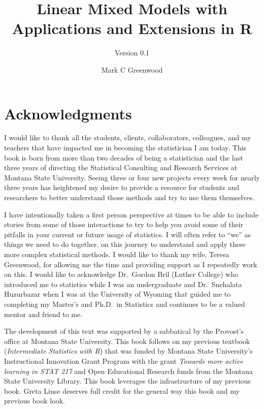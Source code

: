 \documentclass[
]{book}
\title{Linear Mixed Models with Applications and Extensions in R}
\subtitle{Version 0.1}
\author{Mark C Greenwood}
\date{}
\begin{document}
\maketitle

{
\setcounter{tocdepth}{1}
\tableofcontents
}
\hypertarget{acknowledgments}{%
\chapter*{Acknowledgments}\label{acknowledgments}}

I would like to thank all the students, clients, collaborators, colleagues, and my teachers that have impacted me in becoming the statistician I am today. This book is born from more than two decades of being a statistician and the last three years of directing the Statistical Consulting and Research Services at Montana State University. Seeing three or four new projects every week for nearly three years has heightened my desire to provide a resource for students and researchers to better understand those methods and try to use them themselves.

I have intentionally taken a first person perspective at times to be able to include stories from some of those interactions to try to help you avoid some of their pitfalls in your current or future usage of statistics. I will often refer to ``we'' as things we need to do together, on this journey to understand and apply these more complex statistical methods. I would like to thank my wife, Teresa Greenwood, for allowing me the time and providing support as I repeatedly work on this. I would like to acknowledge Dr.~Gordon Bril (Luther College) who introduced me to statistics while I was an undergraduate and Dr.~Snehalata Huzurbazar when I was at the University of Wyoming that guided me to completing my Master's and Ph.D.~in Statistics and continues to be a valued mentor and friend to me.

The development of this text was supported by a sabbatical by the Provost's office at Montana State University. This book follows on my previous textbook (\emph{Intermediate Statistics with R}) that was funded by Montana State University's Instructional Innovation Grant Program with the grant \emph{Towards more active learning in STAT 217} and Open Educational Research funds from the Montana State University Library. This book leverages the infrastructure of my previous book. Greta Linse deserves full credit for the general way this book and my previous book look.
\end{document}
